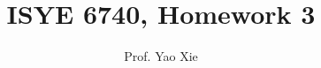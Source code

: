 \documentclass[twoside,12pt]{article}
\begin{document}
\title{ISYE 6740, Homework 3}
\author{Prof. Yao Xie}
\date{}
\maketitle




%
%
%
%
%
%
%
%
%
%
%
%
%
%
\end{document}
